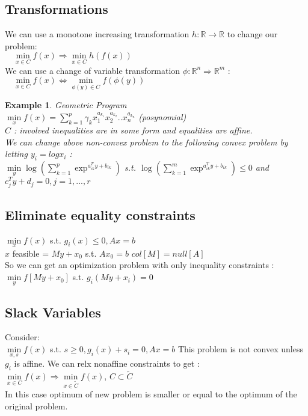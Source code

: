\documentclass[10pt]{article}
\newtheorem{example}[ex]{Example}
\begin{document}
\subsection{Transformations}
We can use a monotone increasing transformation $h: \mathbb{R} \rightarrow \mathbb{R}$ to change our problem: \\
$\quad \min\limits_{x\in C} f(x) \Rightarrow \min\limits_{x\in C} h(f(x)) $ \\
We can use a change of variable transformation $\phi : \mathbb{R}^{n} \Rightarrow \mathbb{R}^{m}$ :  \\
$\quad \min\limits_{x \in C} f(x) \Leftrightarrow \min\limits_{\phi(y) \in C} f(\phi(y))$

\begin{example}
Geometric Program \\
$\min\limits_{x} f(x) = \sum\limits_{k=1}^{p}\gamma_{k}x_{1}^{a_{k_1}}x_{2}^{a_{k_{2}}} ..x_{n}^{a_{k_{n}}} $ (posynomial) \\
 $C$ : involved inequalities are in some form and equalities are affine.  \\
We can change above non-convex problem to the following convex problem by letting $y_{i} = log x_{i}$ : \\
$\min\limits_{y} \log(\sum\limits_{k=1}^{p}\exp^{a_{ik}^{T}y + b_{ik}}) $ s.t. $\log(\sum_{k=1}^{m} \exp^{a_{ik}^{T}y + b_{ik}}) \le 0$ and $c_{j}^{T}y + d_{j} = 0, j = 1, ... , r $
\end{example}

\subsection{Eliminate equality constraints}
$\min\limits_{x}f(x)$ s.t. $g_{i}(x) \le  0, Ax = b$ \\
$x$ feasible = $My + x_{0}$ s.t. $Ax_{0} = b$ $col[M]= null[A]$ \\
So we can get an optimization problem with only inequality constraints :  \\
$\min\limits_{y} f[My+ x_{0}]$ 	s.t. $ g_{i}(My+x_{i}) = 0$

\subsection {Slack Variables}
Consider: \\
$\min\limits_{x,s}f(x) $ s.t. $s \ge 0, g_{i}(x) + s_{i} = 0, Ax= b$
This problem is not convex unless $g_{i}$ is affine. We can relx nonaffine constraints to get : \\
$\min\limits_{x \in C} f(x) \Rightarrow \min\limits_{x \in \tilde{C} } f(x)$,   $C \subset \tilde{C}$ \\
In this case optimum of new problem is smaller or equal to the optimum of the original problem.
\end{document}
